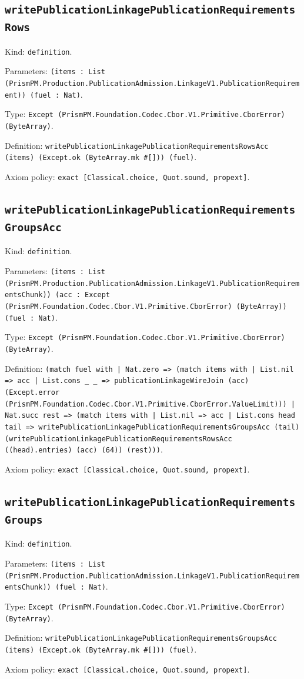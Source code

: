 \documentclass[11pt]{article}
\begin{document}
\subsection*{\texttt{writePublicationLinkagePublicationRequirementsRows}}
\noindent Kind: \texttt{definition}.\par
\noindent Parameters: \texttt{(items : List (PrismPM.Production.PublicationAdmission.LinkageV1.PublicationRequirement)) (fuel : Nat)}.\par
\noindent Type: \texttt{Except (PrismPM.Foundation.Codec.Cbor.V1.Primitive.CborError) (ByteArray)}.\par
\noindent Definition: \texttt{writePublicationLinkagePublicationRequirementsRowsAcc (items) (Except.ok (ByteArray.mk \#[])) (fuel)}.\par
\noindent Axiom policy: \texttt{exact [Classical.choice, Quot.sound, propext]}.\par
\subsection*{\texttt{writePublicationLinkagePublicationRequirementsGroupsAcc}}
\noindent Kind: \texttt{definition}.\par
\noindent Parameters: \texttt{(items : List (PrismPM.Production.PublicationAdmission.LinkageV1.PublicationRequirementsChunk)) (acc : Except (PrismPM.Foundation.Codec.Cbor.V1.Primitive.CborError) (ByteArray)) (fuel : Nat)}.\par
\noindent Type: \texttt{Except (PrismPM.Foundation.Codec.Cbor.V1.Primitive.CborError) (ByteArray)}.\par
\noindent Definition: \texttt{(match fuel with | Nat.zero => (match items with | List.nil => acc | List.cons \_ \_ => publicationLinkageWireJoin (acc) (Except.error (PrismPM.Foundation.Codec.Cbor.V1.Primitive.CborError.ValueLimit))) | Nat.succ rest => (match items with | List.nil => acc | List.cons head tail => writePublicationLinkagePublicationRequirementsGroupsAcc (tail) (writePublicationLinkagePublicationRequirementsRowsAcc ((head).entries) (acc) (64)) (rest)))}.\par
\noindent Axiom policy: \texttt{exact [Classical.choice, Quot.sound, propext]}.\par
\subsection*{\texttt{writePublicationLinkagePublicationRequirementsGroups}}
\noindent Kind: \texttt{definition}.\par
\noindent Parameters: \texttt{(items : List (PrismPM.Production.PublicationAdmission.LinkageV1.PublicationRequirementsChunk)) (fuel : Nat)}.\par
\noindent Type: \texttt{Except (PrismPM.Foundation.Codec.Cbor.V1.Primitive.CborError) (ByteArray)}.\par
\noindent Definition: \texttt{writePublicationLinkagePublicationRequirementsGroupsAcc (items) (Except.ok (ByteArray.mk \#[])) (fuel)}.\par
\noindent Axiom policy: \texttt{exact [Classical.choice, Quot.sound, propext]}.\par
\end{document}

